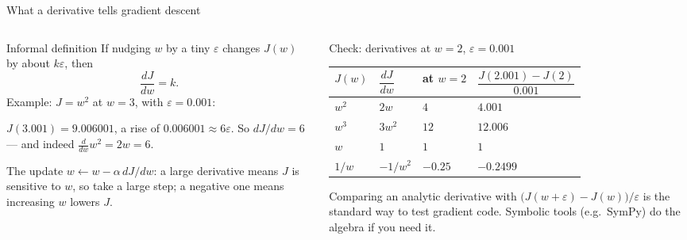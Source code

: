 \documentclass[aspectratio=169,10pt]{beamer}
\begin{document}
\begin{frame}{What a derivative tells gradient descent}
  \begin{columns}[T,onlytextwidth]
    \begin{column}{0.5\textwidth}
      \begin{block}{Informal definition}
        \footnotesize
        If nudging $w$ by a tiny $\varepsilon$ changes $J(w)$ by about $k\varepsilon$, then
        \[ \frac{dJ}{dw}=k. \]
        Example: $J=w^2$ at $w=3$, with $\varepsilon=0.001$:\par
        $J(3.001)=9.006001$, a rise of $0.006001\approx 6\varepsilon$. So $dJ/dw=6$ ---
        and indeed $\tfrac{d}{dw}w^2=2w=6$.
      \end{block}
      \footnotesize
      The update $w\leftarrow w-\alpha\,dJ/dw$: a large derivative means $J$ is sensitive
      to $w$, so take a large step; a negative one means increasing $w$ lowers $J$.
    \end{column}
    \begin{column}{0.46\textwidth}
      \footnotesize
      \begin{block}{Check: derivatives at $w=2$, $\varepsilon=0.001$}
        \renewcommand{\arraystretch}{1.2}
        \begin{tabular}{@{}llll@{}}
          \toprule
          $J(w)$ & $\dfrac{dJ}{dw}$ & at $w=2$ & $\dfrac{J(2.001)-J(2)}{0.001}$\\
          \midrule
          $w^2$   & $2w$        & $4$     & $4.001$\\
          $w^3$   & $3w^2$      & $12$    & $12.006$\\
          $w$     & $1$         & $1$     & $1$\\
          $1/w$   & $-1/w^2$    & $-0.25$ & $-0.2499$\\
          \bottomrule
        \end{tabular}
      \end{block}
      \begin{keyidea}
        Comparing an analytic derivative with $\bigl(J(w+\varepsilon)-J(w)\bigr)/\varepsilon$
        is the standard way to test gradient code. Symbolic tools (e.g.\ SymPy) do the
        algebra if you need it.
      \end{keyidea}
    \end{column}
  \end{columns}
\end{frame}
\end{document}

